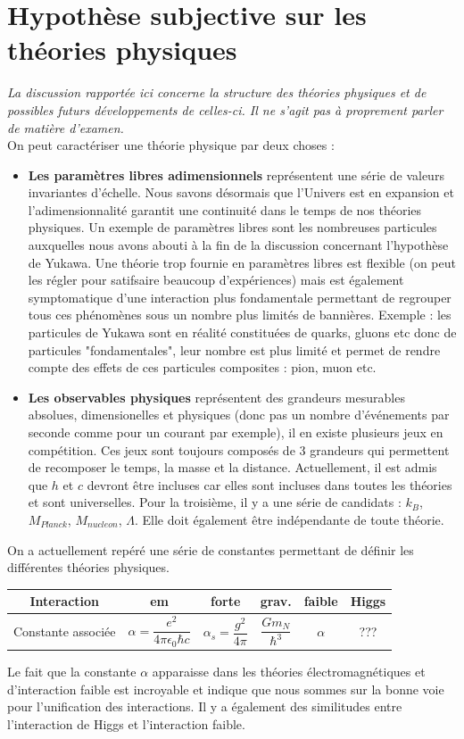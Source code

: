 \section{Hypothèse subjective sur les théories physiques}
\emph{La discussion rapportée ici concerne la structure des théories physiques et de possibles futurs développements de celles-ci. Il ne s'agit pas à proprement parler de matière d'examen.}\\
On peut caractériser une théorie physique par deux choses :
\begin{itemize}[label = $\bullet$]
    \item \textbf{Les paramètres libres adimensionnels} représentent une série de valeurs invariantes d'échelle. Nous savons désormais que l'Univers est en expansion et l'adimensionnalité garantit une continuité dans le temps de nos théories physiques. Un exemple de paramètres libres sont les nombreuses particules auxquelles nous avons abouti à la fin de la discussion concernant l'hypothèse de Yukawa. Une théorie trop fournie en paramètres libres est flexible (on peut les régler pour satifsaire beaucoup d'expériences) mais est également symptomatique d'une interaction plus fondamentale permettant de regrouper tous ces phénomènes sous un nombre plus limités de bannières. Exemple : les particules de Yukawa sont en réalité constituées de quarks, gluons etc donc de particules "fondamentales", leur nombre est plus limité et permet de rendre compte des effets de ces particules composites : pion, muon etc.
    \item \textbf{Les observables physiques} représentent des grandeurs mesurables absolues, dimensionelles et physiques (donc pas un nombre d'événements par seconde comme pour un courant par exemple), il en existe plusieurs jeux en compétition. Ces jeux sont toujours composés de 3 grandeurs qui permettent de recomposer le temps, la masse et la distance. Actuellement, il est admis que $h$ et $c$ devront être incluses car elles sont incluses dans toutes les théories et sont universelles. Pour la troisième, il y a une série de candidats : $k_B$, $M_{Planck}$, $M_{nucleon}$, $\Lambda$. Elle doit également être indépendante de toute théorie.
\end{itemize}
On a actuellement repéré une série de constantes permettant de définir les différentes théories physiques.
\begin{table}[H]
    \centering
    \begin{tabular}{|c|c|c|c|c|c|}
    \hline
         Interaction &em&forte&grav.&faible & Higgs  \\
         \hline
         Constante associée& $\alpha=\dfrac{e^2}{4\pi\epsilon_0\hbar c}$&$\alpha_s=\dfrac{g^2}{4\pi}$&$\dfrac{Gm_N}{\hbar^3}$&$\alpha$&???\\
         \hline
    \end{tabular}
\end{table}
Le fait que la constante $\alpha$ apparaisse dans les théories électromagnétiques et d'interaction faible est incroyable et indique que nous sommes sur la bonne voie pour l'unification des interactions. Il y a également des similitudes entre l'interaction de Higgs et l'interaction faible.





